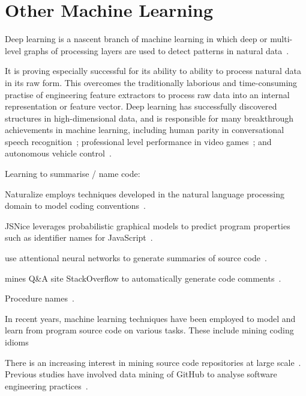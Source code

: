 \section{Other Machine Learning}
\label{sec:related-work-other}

Deep learning is a nascent branch of machine learning in which deep or multi-level graphs of processing layers are used to detect patterns in natural data~\cite{LeCun2015,Wang2017}.

It is proving especially successful for its ability to ability to process natural data in its raw form. This overcomes the traditionally laborious and time-consuming practise of engineering feature extractors to process raw data into an internal representation or feature vector. Deep learning has successfully discovered structures in high-dimensional data, and is responsible for many breakthrough achievements in machine learning, including human parity in conversational speech recognition~\cite{Xiong2016}; professional level performance in video games~\cite{Mnih2015}; and autonomous vehicle control~\cite{Lozano-Perez2012}.


Learning to summarise / name code:

Naturalize employs techniques developed in the natural language processing domain to model coding conventions~\cite{Allamanis2014a}.

JSNice leverages probabilistic graphical models to predict program properties such as identifier names for JavaScript~\cite{Raychev}.

\citeauthor{Allamanis2016} use attentional neural networks to generate summaries of source code~\cite{Allamanis2016}.

\citeauthor{Wong2013} mines Q\&A site StackOverflow to automatically generate code comments~\cite{Wong2013}.

Procedure names~\cite{David}.

In recent years, machine learning techniques have been employed to model and learn from program source code on various tasks. These include mining coding  idioms~\cite{Allamanis2014}

There is an increasing interest in mining source code repositories at large scale~\cite{Allamanis2013a,White2015a,Bird2009}. Previous studies have involved data mining of GitHub to analyse software engineering practices~\cite{Wu2014,Guzman2014,Baishakhi2014a,Vasilescu2015}.

